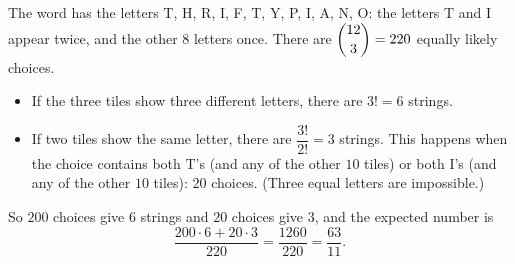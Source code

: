 The word has the letters T, H, R, I, F, T, Y, P, I, A, N, O: the letters T and I appear twice, and the other $8$ letters once. There are $\dbinom{12}{3}=220$ equally likely choices.

\begin{itemize}
\item If the three tiles show three different letters, there are $3!=6$ strings.
\item If two tiles show the same letter, there are $\dfrac{3!}{2!}=3$ strings. This happens when the choice contains both T's (and any of the other $10$ tiles) or both I's (and any of the other $10$ tiles): $20$ choices. (Three equal letters are impossible.)
\end{itemize}
So $200$ choices give $6$ strings and $20$ choices give $3$, and the expected number is
\[\dfrac{200\cdot6+20\cdot3}{220}=\dfrac{1260}{220}=\boxed{\dfrac{63}{11}}.\]
